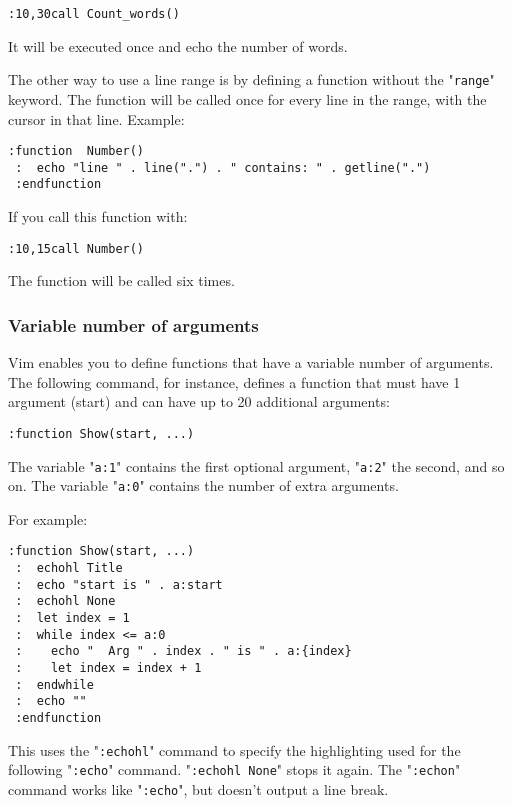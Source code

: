 \begin{Verbatim}[samepage=true]
 :10,30call Count_words()
\end{Verbatim}

It will be executed once and echo the number of words.

The other way to use a line range is by defining a function without the "\texttt{range}" keyword.
The function will be called once for every line in the range, with the cursor in that line.
Example:

\begin{Verbatim}[samepage=true]
 :function  Number()
 :  echo "line " . line(".") . " contains: " . getline(".")
 :endfunction
\end{Verbatim}

If you call this function with:

\begin{Verbatim}[samepage=true]
 :10,15call Number()
\end{Verbatim}

The function will be called six times.
\subsubsection{Variable number of arguments}
Vim enables you to define functions that have a variable number of arguments.
The following command, for instance, defines a function that must have 1 argument (start) and can have up to 20 additional arguments:

\begin{Verbatim}[samepage=true]
 :function Show(start, ...)
\end{Verbatim}

The variable "\texttt{a:1}" contains the first optional argument, "\texttt{a:2}" the second, and so on.
The variable "\texttt{a:0}" contains the number of extra arguments.

For example:

\begin{Verbatim}[samepage=true]
 :function Show(start, ...)
 :  echohl Title
 :  echo "start is " . a:start
 :  echohl None
 :  let index = 1
 :  while index <= a:0
 :    echo "  Arg " . index . " is " . a:{index}
 :    let index = index + 1
 :  endwhile
 :  echo ""
 :endfunction
\end{Verbatim}

This uses the "\texttt{:echohl}" command to specify the highlighting used for the following "\texttt{:echo}" command.
"\texttt{:echohl None}" stops it again.
The "\texttt{:echon}" command works like "\texttt{:echo}", but doesn't output a line break.

